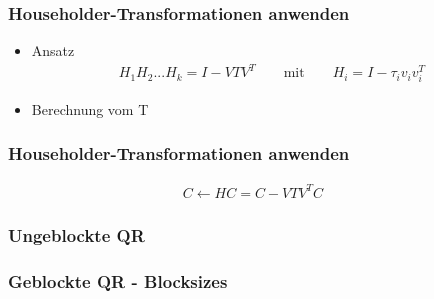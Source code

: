 \begin{frame}
	\frametitle{Householder-Transformationen anwenden}
	\begin{itemize}
		\item Ansatz
		\begin{align*}
			H_1H_2...H_k = I - VTV^T \qquad \text{mit}\qquad H_i = I - \tau_i v_iv_i^T
		\end{align*}
		\item Berechnung vom T
	\end{itemize}
\end{frame}

\begin{frame}
	\frametitle{Householder-Transformationen anwenden}
	\begin{align*}
		C \leftarrow H C = C - V T V^T C \quad %
	\end{align*}
	\centering
	

\end{frame}

\begin{frame}
	\frametitle{Ungeblockte QR}
	\centering
\end{frame}

\begin{frame}
	\frametitle{Geblockte QR - Blocksizes}
		\centering
\end{frame}

